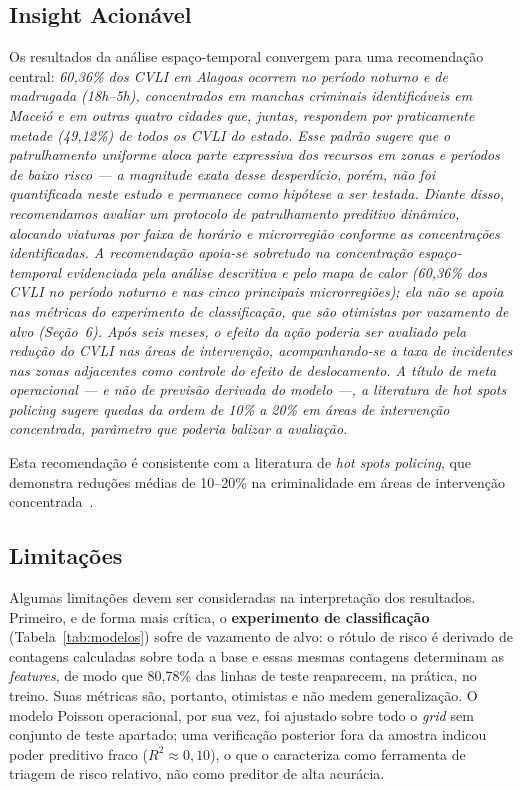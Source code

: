 \documentclass[12pt]{article}
\begin{document}
\subsection{Insight Acionável}
Os resultados da análise espaço-temporal convergem para uma recomendação
central: \textit{60,36\% dos CVLI em Alagoas ocorrem no período noturno e de
madrugada (18h--5h), concentrados em manchas criminais identificáveis em
Maceió e em outras quatro cidades que, juntas, respondem por praticamente
metade (49,12\%) de todos os CVLI do estado. Esse padrão sugere que o
patrulhamento uniforme aloca parte expressiva dos recursos em zonas e períodos
de baixo risco --- a magnitude exata desse desperdício, porém, não foi
quantificada neste estudo e permanece como hipótese a ser testada. Diante
disso, recomendamos avaliar um protocolo de patrulhamento preditivo dinâmico,
alocando viaturas por faixa de horário e microrregião conforme as
concentrações identificadas. A recomendação apoia-se sobretudo na
concentração espaço-temporal evidenciada pela análise descritiva e pelo
mapa de calor (60,36\% dos CVLI no período noturno e nas cinco principais
microrregiões); ela \emph{não} se apoia nas métricas do experimento de
classificação, que são otimistas por vazamento de alvo (Seção~6). Após seis
meses, o efeito da ação poderia ser avaliado pela redução do CVLI nas áreas de
intervenção, acompanhando-se a taxa de incidentes nas zonas adjacentes como
controle do efeito de deslocamento. A título de meta operacional --- e não de
previsão derivada do modelo ---, a literatura de \textit{hot spots policing}
sugere quedas da ordem de 10\% a 20\% em áreas de intervenção concentrada,
parâmetro que poderia balizar a avaliação.}

Esta recomendação é consistente com a literatura de \textit{hot spots
policing}, que demonstra reduções médias de 10--20\% na criminalidade em
áreas de intervenção concentrada~\cite{sherman:1989, weisburd:2016}.

\subsection{Limitações}
Algumas limitações devem ser consideradas na interpretação dos resultados.
Primeiro, e de forma mais crítica, o \textbf{experimento de classificação}
(Tabela~\ref{tab:modelos}) sofre de vazamento de alvo: o rótulo de risco é
derivado de contagens calculadas sobre toda a base e essas mesmas contagens
determinam as \textit{features}, de modo que 80,78\% das linhas de teste
reaparecem, na prática, no treino. Suas métricas são, portanto, otimistas e não
medem generalização. O modelo Poisson operacional, por sua vez, foi ajustado
sobre todo o \textit{grid} sem conjunto de teste apartado; uma verificação
posterior fora da amostra indicou poder preditivo fraco ($R^2 \approx 0{,}10$),
o que o caracteriza como ferramenta de triagem de risco relativo, não como
preditor de alta acurácia.
\end{document}
